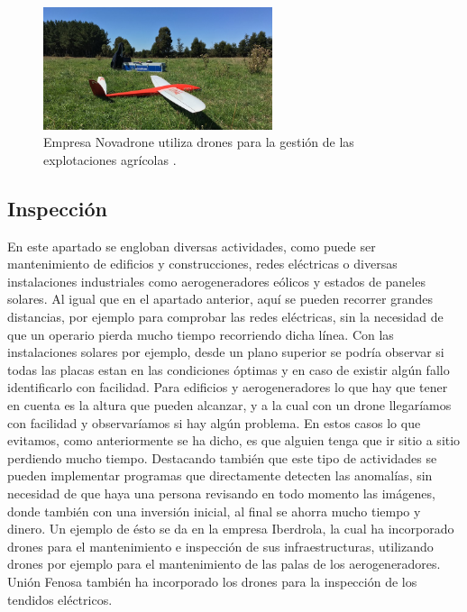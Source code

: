 	
\begin{figure}[H]
	\centering
		\includegraphics[width=0.6\textwidth]{imgs/novadrone.jpg}
		\caption{Empresa Novadrone utiliza drones para la gesti\'on de las explotaciones agr\'icolas .}
	\label{fig: Empresa Novadrone, aplicaciones en agricultura.}
\end{figure}

	\subsection{Inspecci\'on} 
\hspace{1 cm}En este apartado se engloban diversas actividades, como puede ser mantenimiento de edificios y construcciones, redes el\'ectricas o diversas instalaciones industriales como aerogeneradores e\'olicos y estados de paneles solares. Al igual que en el apartado anterior, aqu\'i se pueden recorrer grandes distancias, por ejemplo para comprobar las redes el\'ectricas, sin la necesidad de que un operario pierda mucho tiempo recorriendo dicha l\'inea. Con las instalaciones solares por ejemplo, desde un plano superior se podr\'ia observar si todas las placas estan en las condiciones \'optimas y en caso de existir alg\'un fallo identificarlo con facilidad. Para edificios y aerogeneradores lo que hay que tener en cuenta es la altura que pueden alcanzar, y a la cual con un drone llegar\'iamos con facilidad y observar\'iamos si hay alg\'un problema. En estos casos lo que evitamos, como anteriormente se ha dicho, es que alguien tenga que ir sitio a sitio perdiendo mucho tiempo. Destacando tambi\'en que este tipo de actividades se pueden implementar programas que directamente detecten las anomal\'ias, sin necesidad de que haya una persona revisando en todo momento las im\'agenes, donde tambi\'en con una inversi\'on inicial, al final se ahorra mucho tiempo y dinero. Un ejemplo de \'esto se da en la empresa Iberdrola, la cual ha incorporado drones para el mantenimiento e inspecci\'on de sus infraestructuras, utilizando drones por ejemplo para el mantenimiento de las palas de los aerogeneradores. Uni\'on Fenosa tambi\'en ha incorporado los drones para la inspecci\'on de los tendidos el\'ectricos. 


